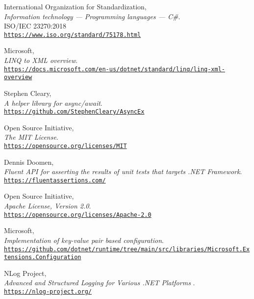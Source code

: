 \begin{thebibliography}{X}
            International Organization for Standardization,
            \\ \textit{Information technology — Programming languages — C\#}.\\
            ISO/IEC 23270:2018
            \\ \texttt{\url{https://www.iso.org/standard/75178.html}}
        
            Microsoft,
            \\ \textit{LINQ to XML overview}.
            \\ \texttt{\url{https://docs.microsoft.com/en-us/dotnet/standard/linq/linq-xml-overview}}
        
            Stephen Cleary,
            \\ \textit{A helper library for async/await}.
            \\ \texttt{\url{https://github.com/StephenCleary/AsyncEx}}
            
            Open Source Initiative,
            \\ \textit{The MIT License}.
            \\ \texttt{\url{https://opensource.org/licenses/MIT}}
        
            Dennis Doomen,
            \\ \textit{Fluent API for asserting the results of unit tests that targets .NET Framework}.
            \\ \texttt{\url{https://fluentassertions.com/}}
            
            Open Source Initiative,
            \\ \textit{Apache License, Version 2.0}.
            \\ \texttt{\url{https://opensource.org/licenses/Apache-2.0}}
        
            Microsoft,
            \\ \textit{Implementation of key-value pair based configuration}.
            \\ \texttt{\url{https://github.com/dotnet/runtime/tree/main/src/libraries/Microsoft.Extensions.Configuration}}
            
            NLog Project,
            \\ \textit{Advanced and Structured Logging for Various .NET Platforms }.
            \\ \texttt{\url{https://nlog-project.org/}}
            

\end{thebibliography}
